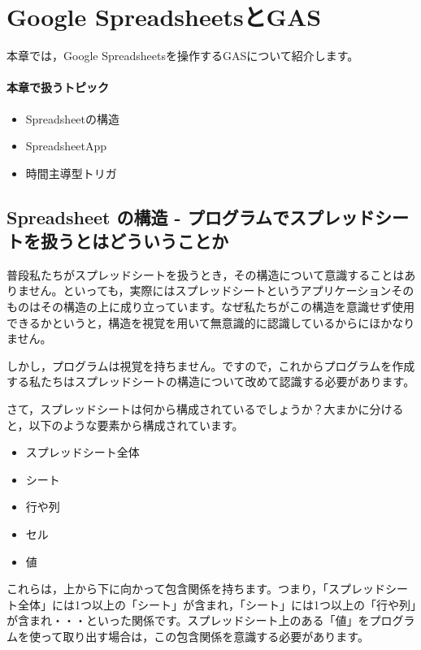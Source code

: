 \documentclass[uplatex,a4j]{jsarticle}
\begin{document}
\clearpage

\section{Google SpreadsheetsとGAS}

本章では，Google Spreadsheetsを操作するGASについて紹介します。

\paragraph{本章で扱うトピック}
\begin{itemize}
\item Spreadsheetの構造
\item SpreadsheetApp
\item 時間主導型トリガ
\end{itemize}

\subsection{Spreadsheet の構造 - プログラムでスプレッドシートを扱うとはどういうことか}


普段私たちがスプレッドシートを扱うとき，その構造について意識することはありません。といっても，実際にはスプレッドシートというアプリケーションそのものはその構造の上に成り立っています。なぜ私たちがこの構造を意識せず使用できるかというと，構造を視覚を用いて無意識的に認識しているからにほかなりません。

しかし，プログラムは視覚を持ちません。ですので，これからプログラムを作成する私たちはスプレッドシートの構造について改めて認識する必要があります。

さて，スプレッドシートは何から構成されているでしょうか？大まかに分けると，以下のような要素から構成されています。

\begin{itemize}
\item スプレッドシート全体
\item シート
\item 行や列
\item セル
\item 値
\end{itemize}

これらは，上から下に向かって包含関係を持ちます。つまり，「スプレッドシート全体」には1つ以上の「シート」が含まれ，「シート」には1つ以上の「行や列」が含まれ・・・といった関係です。スプレッドシート上のある「値」をプログラムを使って取り出す場合は，この包含関係を意識する必要があります。
\end{document}
